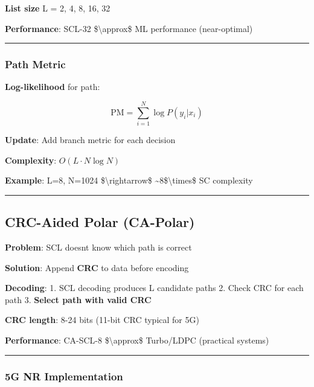 \textbf{List size} L = 2, 4, 8, 16, 32

\textbf{Performance}: SCL-32 \$\textbackslash approx\$ ML performance
(near-optimal)

\begin{center}\rule{0.5\linewidth}{0.5pt}\end{center}

\subsubsection{Path Metric}\label{path-metric}

\textbf{Log-likelihood} for path:

\[
\text{PM} = \sum_{i=1}^{N} \log P(y_i | x_i)
\]

\textbf{Update}: Add branch metric for each decision

\textbf{Complexity}: \(O(L \cdot N \log N)\)

\textbf{Example}: L=8, N=1024 \$\textbackslash rightarrow\$
\textasciitilde8\$\textbackslash times\$ SC complexity

\begin{center}\rule{0.5\linewidth}{0.5pt}\end{center}

\subsection{CRC-Aided Polar (CA-Polar)}\label{crc-aided-polar-ca-polar}

\textbf{Problem}: SCL doesn\textquotesingle t know which path is correct

\textbf{Solution}: Append \textbf{CRC} to data before encoding

\textbf{Decoding}: 1. SCL decoding produces L candidate paths 2. Check
CRC for each path 3. \textbf{Select path with valid CRC}

\textbf{CRC length}: 8-24 bits (11-bit CRC typical for 5G)

\textbf{Performance}: CA-SCL-8 \$\textbackslash approx\$ Turbo/LDPC
(practical systems)

\begin{center}\rule{0.5\linewidth}{0.5pt}\end{center}

\subsubsection{5G NR Implementation}\label{g-nr-implementation}

